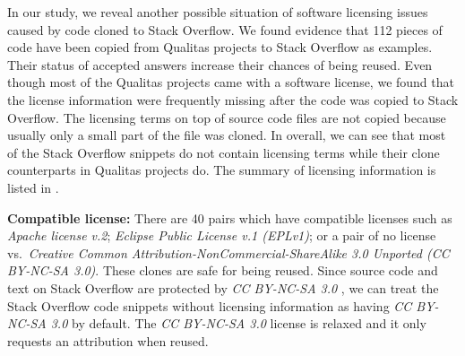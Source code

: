 \documentclass[sigconf,review, anonymous]{acmart}
\begin{document}
In our study, we reveal another possible situation of software
licensing issues caused by code cloned to Stack Overflow. We found
evidence that 112 pieces of code have been copied from Qualitas
projects to Stack Overflow as examples. Their status of accepted
answers increase their chances of being reused. Even though most of
the Qualitas projects came with a software license, we found that the license information
were frequently missing after the code was copied to Stack
Overflow. The licensing terms on top of source code files are not
copied because usually only a small part of the file was
cloned. In overall, we can see that most of the Stack Overflow snippets do not
contain licensing terms while their clone counterparts in Qualitas
projects do. The summary of
licensing information is listed in .

\textbf{Compatible license:} There are 40 pairs which have compatible
licenses such as \emph{Apache license v.2}; \emph{Eclipse Public
  License v.1 (EPLv1)}; or a pair of no license vs.~\emph{Creative
  Common Attribution-NonCommercial-ShareAlike 3.0 Unported (CC
  BY-NC-SA 3.0)}. These clones are safe for being reused. Since source
code and text on Stack Overflow are
protected by \emph{CC BY-NC-SA 3.0}
, we can treat the Stack Overflow code snippets
without licensing information as having \emph{CC BY-NC-SA 3.0} by
default. The \emph{CC BY-NC-SA 3.0} license is relaxed and it only
requests an attribution when reused.
\end{document}
